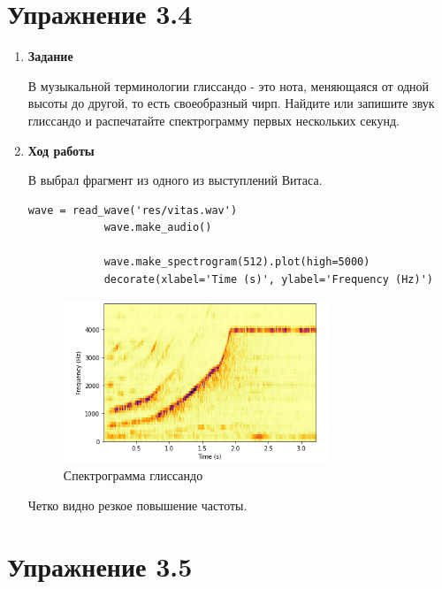 \documentclass[a4paper,12pt]{article}
\begin{document}
	\newpage
	
	\section{Упражнение 3.4}
	
	\begin{enumerate}
		
		\item \textbf{Задание}
		
		В музыкальной терминологии глиссандо - это нота, меняющаяся от одной высоты до другой, то есть своеобразный чирп.
		Найдите или запишите звук глиссандо и распечатайте спектрограмму первых нескольких секунд.
		
		
		\item \textbf{Ход работы}
		
		В выбрал фрагмент из одного из выступлений Витаса.
		\begin{lstlisting}[caption=Воспроизведение глиссандо и построение спектрограммы]
			wave = read_wave('res/vitas.wav')
			wave.make_audio()
			
			wave.make_spectrogram(512).plot(high=5000)
			decorate(xlabel='Time (s)', ylabel='Frequency (Hz)')
		\end{lstlisting}
		\begin{figure}[H]
			\centering
			\includegraphics[width=0.75\textwidth]{4_1.png}
			\caption{Спектрограмма глиссандо}
			\label{fig:4.1}
		\end{figure}
		
		Четко видно резкое повышение частоты.
		
	\end{enumerate}
	
	\newpage
	
	\section{Упражнение 3.5}
	
\end{document}
